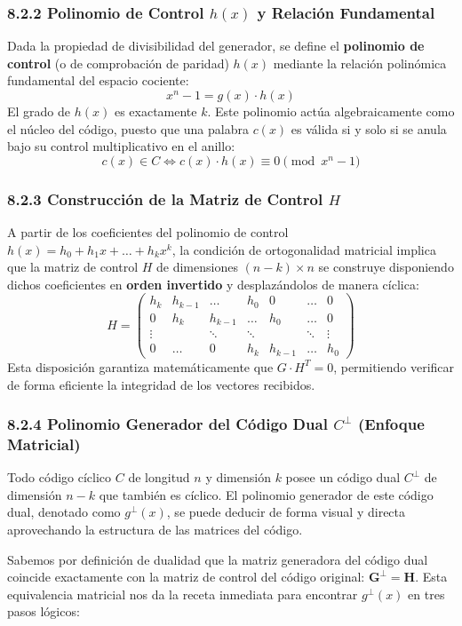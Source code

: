\documentclass{article}
\begin{document}
\subsubsection{8.2.2 Polinomio de Control $h(x)$ y Relación Fundamental}
Dada la propiedad de divisibilidad del generador, se define el \textbf{polinomio de control} (o de comprobación de paridad) $h(x)$ mediante la relación polinómica fundamental del espacio cociente:
\[
x^n - 1 = g(x) \cdot h(x)
\]
El grado de $h(x)$ es exactamente $k$. Este polinomio actúa algebraicamente como el núcleo del código, puesto que una palabra $c(x)$ es válida si y solo si se anula bajo su control multiplicativo en el anillo:
\[
c(x) \in C \iff c(x) \cdot h(x) \equiv 0 \pmod{x^n - 1}
\]

\subsubsection{8.2.3 Construcción de la Matriz de Control $H$}
A partir de los coeficientes del polinomio de control $h(x) = h_0 + h_1x + \dots + h_kx^k$, la condición de ortogonalidad matricial implica que la matriz de control $H$ de dimensiones $(n-k) \times n$ se construye disponiendo dichos coeficientes en \textbf{orden invertido} y desplazándolos de manera cíclica:
\[
H = \begin{pmatrix}
h_k & h_{k-1} & \dots & h_0 & 0 & \dots & 0 \\
0 & h_k & h_{k-1} & \dots & h_0 & \dots & 0 \\
\vdots & & \ddots & \ddots & & \ddots & \vdots \\
0 & \dots & 0 & h_k & h_{k-1} & \dots & h_0
\end{pmatrix}
\]
Esta disposición garantiza matemáticamente que $G \cdot H^T = 0$, permitiendo verificar de forma eficiente la integridad de los vectores recibidos.

\subsubsection{8.2.4 Polinomio Generador del Código Dual \texorpdfstring{$C^\perp$}{C-perp} (Enfoque Matricial)}
Todo código cíclico $C$ de longitud $n$ y dimensión $k$ posee un código dual $C^\perp$ de dimensión $n-k$ que también es cíclico. El polinomio generador de este código dual, denotado como $g^\perp(x)$, se puede deducir de forma visual y directa aprovechando la estructura de las matrices del código.

Sabemos por definición de dualidad que la matriz generadora del código dual coincide exactamente con la matriz de control del código original: $\mathbf{G^\perp = H}$.
Esta equivalencia matricial nos da la receta inmediata para encontrar $g^\perp(x)$ en tres pasos lógicos:
\end{document}
